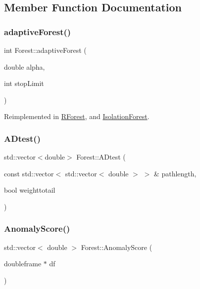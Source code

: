 \subsection{Member Function Documentation}
\mbox{\label{classForest_a825bb350730c50aa8924e9f761c4a2a4}} 
\subsubsection{\texorpdfstring{adaptive\+Forest()}{adaptiveForest()}}
{\footnotesize\ttfamily int Forest\+::adaptive\+Forest (\begin{DoxyParamCaption}\item[{double}]{alpha,  }\item[{int}]{stop\+Limit }\end{DoxyParamCaption})\hspace{0.3cm}{\ttfamily [virtual]}}



Reimplemented in \hyperlink{classRForest_abc389cab7fa7ffee669b3add5aad4c52}{R\+Forest}, and \hyperlink{classIsolationForest_a33dae487524bd1fdaf085a36dab04ee9}{Isolation\+Forest}.

\mbox{\label{classForest_a695e24a0ca4a1a5685f4ab1eb996984c}} 
\subsubsection{\texorpdfstring{A\+Dtest()}{ADtest()}}
{\footnotesize\ttfamily std\+::vector$<$double$>$ Forest\+::\+A\+Dtest (\begin{DoxyParamCaption}\item[{const std\+::vector$<$ std\+::vector$<$ double $>$ $>$ \&}]{pathlength,  }\item[{bool}]{weighttotail }\end{DoxyParamCaption})}

\mbox{\label{classForest_a39c34e59ac0088959ce86ddd6bacf9f1}} 
\subsubsection{\texorpdfstring{Anomaly\+Score()}{AnomalyScore()}}
{\footnotesize\ttfamily std\+::vector$<$ double $>$ Forest\+::\+Anomaly\+Score (\begin{DoxyParamCaption}\item[{doubleframe $\ast$}]{df }\end{DoxyParamCaption})}

